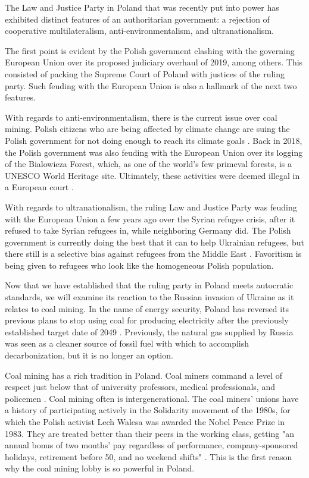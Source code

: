 \documentclass[12pt,letterpaper]{article}
\begin{document}
\begin{flushleft}
The Law and Justice Party in Poland that was recently put into power has exhibited distinct features of an authoritarian government: a rejection of cooperative multilateralism, anti-environmentalism, and ultranationalism.

The first point is evident by the Polish government clashing with the governing European Union over its proposed judiciary overhaul of 2019, among others. \autocite{noauthor_poland_2023} This consisted of packing the Supreme Court of Poland with justices of the ruling party. Such feuding with the European Union is also a hallmark of the next two features.

With regards to anti-environmentalism, there is the current issue over coal mining. Polish citizens who are being affected by climate change are suing the Polish government for not doing enough to reach its climate goals \autocite{noauthor_why_nodate}. Back in 2018, the Polish government was also feuding with the European Union over its logging of the Bialowieza Forest, which, as one of the world's few primeval forests, is a UNESCO World Heritage site. Ultimately, these activities were deemed illegal in a European court \autocite{schiermeier_eus_2018}.

With regards to ultranationalism, the ruling Law and Justice Party was feuding with the European Union a few years ago over the Syrian refugee crisis, after it refused to take Syrian refugees in, while neighboring Germany did. \autocite{noauthor_why_2017} The Polish government is currently doing the best that it can to help Ukrainian refugees, but there still is a selective bias against refugees from the Middle East \autocite{ciobanu_selective_2022}. Favoritism is being given to refugees who look like the homogeneous Polish population.

Now that we have established that the ruling party in Poland meets autocratic standards, we will examine its reaction to the Russian invasion of Ukraine as it relates to coal mining. In the name of energy security, Poland has reversed its previous plans to stop using coal for producing electricity after the previously established target date of 2049 \autocite{noauthor_poland_2022}. Previously, the natural gas supplied by Russia was seen as a cleaner source of fossil fuel with which to accomplish decarbonization, but it is no longer an option.

Coal mining has a rich tradition in Poland. Coal miners command a level of respect just below that of university professors, medical professionals, and policemen \autocite{zielonka_how_2021}. Coal mining often is intergenerational. The coal miners' unions have a history of participating actively in the Solidarity movement of the 1980s, for which the Polish activist Lech Walesa was awarded the Nobel Peace Prize in 1983. They are treated better than their peers in the working class, getting "an annual bonus of two months' pay regardless of performance, company-sponsored holidays, retirement before 50, and no weekend shifts" \autocite{noauthor_polish_2015}. This is the first reason why the coal mining lobby is so powerful in Poland.


\end{flushleft}
\end{document}
